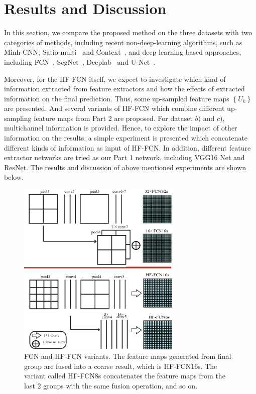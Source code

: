 \section{Results and Discussion}
\label{Sec:Res}

In this section, we compare the proposed method on the three datasets with two categories of methods, including recent non-deep-learning algorithms, such as Minh-CNN\cite{IEEEexample:mnih2013machine}, Satio-multi~\cite{IEEEexample:saito2016multiple} and Context~\cite{IEEEexample:audebert2017deep}, and deep-learning based approaches, including FCN~\cite{IEEEexample:Long_2015_CVPR}, SegNet~\cite{IEEEexample:badrinarayanan2017segnet}, Deeplab~\cite{IEEEexample:chen2016deeplab} and U-Net~\cite{IEEEexample:ronneberger2015u}.


Moreover, for the HF-FCN itself, we expect to investigate which kind of information extracted from feature extractors and how the effects of extracted information on the final prediction.
Thus, some up-sampled feature maps ${\left\{U_k\right\}}$ are presented.
And several variants of HF-FCN which combine different up-sampling feature maps from Part 2 are proposed.
%
For dataset ${b)}$ and ${c)}$, multichannel information is provided.
Hence, to explore the impact of other information on the results, a simple experiment is presented which concatenate different kinds of information as input of HF-FCN.
In addition, different feature extractor networks are tried as our Part 1 network, including VGG16 Net and ResNet.
The results and discussion of above mentioned experiments are shown below.


\begin{figure}[t] 
\centering
\includegraphics[width=7.8cm]{Figures/vairants.eps}
\caption{FCN and HF-FCN variants. The feature maps generated from final group are fused into a coarse result, which is HF-FCN16s. 
The variant called HF-FCN8s concatenates the feature maps from the last 2 groups with the same fusion operation, and so on.}
\label{fig:Variants}
\end{figure}

